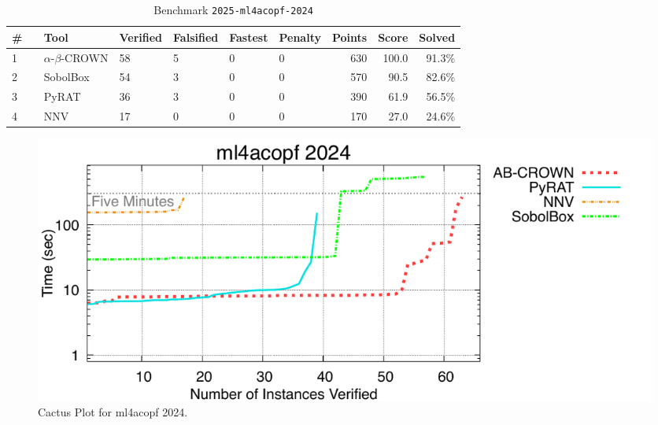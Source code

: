 \clearpage

\begin{table}[h]
\begin{center}
\caption{Benchmark \texttt{2025-ml4acopf-2024}} \label{tab:cat_2025_ml4acopf_2024}
{\setlength{\tabcolsep}{2pt}
\begin{tabular}[h]{@{}llllllrrr@{}}
\toprule
\textbf{\# ~} & \textbf{Tool} & \textbf{Verified} & \textbf{Falsified} & \textbf{Fastest} & \textbf{Penalty} & \textbf{Points} & \textbf{Score} & \textbf{Solved}\\
\midrule
1 & $\alpha$-$\beta$-CROWN & 58 & 5 & 0 & 0 & 630 & 100.0 & 91.3\% \\
2 & SobolBox & 54 & 3 & 0 & 0 & 570 & 90.5 & 82.6\% \\
3 & PyRAT & 36 & 3 & 0 & 0 & 390 & 61.9 & 56.5\% \\
4 & NNV & 17 & 0 & 0 & 0 & 170 & 27.0 & 24.6\% \\
\bottomrule
\end{tabular}
}
\end{center}
\end{table}



\begin{figure}[h]
\centerline{\includegraphics[width=\textwidth]{cactus/2025_ml4acopf_2024.pdf}}
\caption{Cactus Plot for ml4acopf 2024.}
\label{fig:quantPic}
\end{figure}


\clearpage

